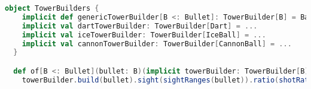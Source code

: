 \begin{lstlisting}[label=code:builder, language=Scala, caption=Builder delle tipologie di torre]
object TowerBuilders {
    implicit def genericTowerBuilder[B <: Bullet]: TowerBuilder[B] = BaseTower[B](_)
    implicit val dartTowerBuilder: TowerBuilder[Dart] = ...
    implicit val iceTowerBuilder: TowerBuilder[IceBall] = ...
    implicit val cannonTowerBuilder: TowerBuilder[CannonBall] = ...
  }

  def of[B <: Bullet](bullet: B)(implicit towerBuilder: TowerBuilder[B]): Tower[B] =
    towerBuilder.build(bullet).sight(sightRanges(bullet)).ratio(shotRatios(bullet))
\end{lstlisting}
